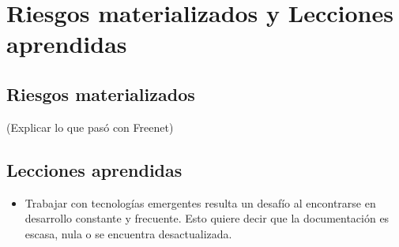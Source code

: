 \section{Riesgos materializados y Lecciones aprendidas}

\subsection{Riesgos materializados}

(Explicar lo que pasó con Freenet)

\subsection{Lecciones aprendidas}

\begin{itemize}
    \item Trabajar con tecnologías emergentes resulta un desafío al encontrarse en desarrollo constante y frecuente. Esto quiere decir que la documentación es escasa, nula o se encuentra desactualizada.
\end{itemize}